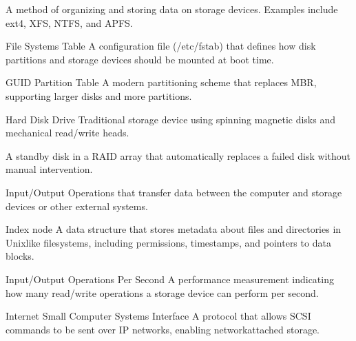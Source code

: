 \documentclass[letterpaper,10pt,english]{sphinxmanual}
\begin{document}
\begin{description}
\sphinxAtStartPar
A method of organizing and storing data on storage devices. Examples include ext4, XFS, NTFS, and APFS.

\sphinxAtStartPar
File Systems Table \sphinxhyphen{} A configuration file (/etc/fstab) that defines how disk partitions and storage devices should be mounted at boot time.

\sphinxAtStartPar
GUID Partition Table \sphinxhyphen{} A modern partitioning scheme that replaces MBR, supporting larger disks and more partitions.

\sphinxAtStartPar
Hard Disk Drive \sphinxhyphen{} Traditional storage device using spinning magnetic disks and mechanical read/write heads.

\sphinxAtStartPar
A standby disk in a RAID array that automatically replaces a failed disk without manual intervention.

\sphinxAtStartPar
Input/Output \sphinxhyphen{} Operations that transfer data between the computer and storage devices or other external systems.

\sphinxAtStartPar
Index node \sphinxhyphen{} A data structure that stores metadata about files and directories in Unix\sphinxhyphen{}like filesystems, including permissions, timestamps, and pointers to data blocks.

\sphinxAtStartPar
Input/Output Operations Per Second \sphinxhyphen{} A performance measurement indicating how many read/write operations a storage device can perform per second.

\sphinxAtStartPar
Internet Small Computer Systems Interface \sphinxhyphen{} A protocol that allows SCSI commands to be sent over IP networks, enabling network\sphinxhyphen{}attached storage.


\end{description}
\end{document}
